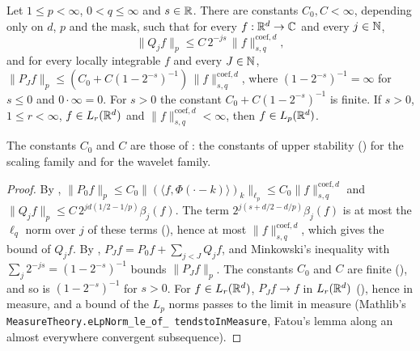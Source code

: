 \begin{proposition}
\label{prop:daub-rd-synthesis}
\leanok
{}
Let $1 \leq p < \infty$, $0 < q \leq \infty$ and $s \in \mathbb{R}$. There are constants
$C_0, C < \infty$, depending only on $d$, $p$ and the mask, such that for every
$f : \mathbb{R}^d \to \mathbb{C}$ and every $j \in \mathbb{N}$,
\[
  \|Q_j f\|_p \leq C \, 2^{-js} \, \|f\|^{\mathrm{coef},d}_{s,q} ,
\]
and for every locally integrable $f$ and every $J \in \mathbb{N}$,
$\|P_J f\|_p \leq (C_0 + C (1 - 2^{-s})^{-1}) \, \|f\|^{\mathrm{coef},d}_{s,q}$, where
$(1 - 2^{-s})^{-1} = \infty$ for $s \leq 0$ and $0 \cdot \infty = 0$. For $s > 0$ the constant
$C_0 + C (1 - 2^{-s})^{-1}$ is finite. If $s > 0$, $1 \leq r < \infty$, $f \in L_r(\mathbb{R}^d)$ and
$\|f\|^{\mathrm{coef},d}_{s,q} < \infty$, then $f \in L_p(\mathbb{R}^d)$.
\end{proposition}

The constants $C_0$ and $C$ are those of : the constants of upper
stability () for the scaling family and for the wavelet family.

\begin{proof}
\leanok
{}
By ,
$\|P_0 f\|_p \leq C_0 \|(\langle f, \Phi(\cdot - k) \rangle)_k\|_{\ell_p} \leq C_0
\|f\|^{\mathrm{coef},d}_{s,q}$ and $\|Q_j f\|_p \leq C \, 2^{jd(1/2 - 1/p)} \beta_j(f)$. The term
$2^{j(s + d/2 - d/p)} \beta_j(f)$ is at most the $\ell_q$ norm over $j$ of these terms
(), hence at most $\|f\|^{\mathrm{coef},d}_{s,q}$, which gives the bound of
$Q_j f$. By , $P_J f = P_0 f + \sum_{j < J} Q_j f$, and Minkowski's
inequality with $\sum_j 2^{-js} = (1 - 2^{-s})^{-1}$ bounds $\|P_J f\|_p$. The constants $C_0$
and $C$ are finite (), and so is $(1 - 2^{-s})^{-1}$ for
$s > 0$. For
$f \in L_r(\mathbb{R}^d)$, $P_J f \to f$ in $L_r(\mathbb{R}^d)$ (), hence in measure,
and a bound of the $L_p$ norms passes to the limit in measure (Mathlib's
\texttt{MeasureTheory.\allowbreak eLpNorm\_\allowbreak le\_\allowbreak of\_\allowbreak
tendstoInMeasure}, Fatou's lemma along an almost everywhere convergent subsequence).
\end{proof}

